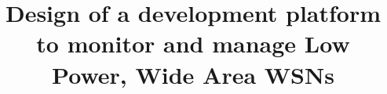 \documentclass[a4paper, 10pt, conference]{report}
\begin{document}
\title{Design of a development platform to monitor and manage Low Power, Wide Area WSNs}
\maketitle
\newpage
\tableofcontents
\newpage






\end{document}
